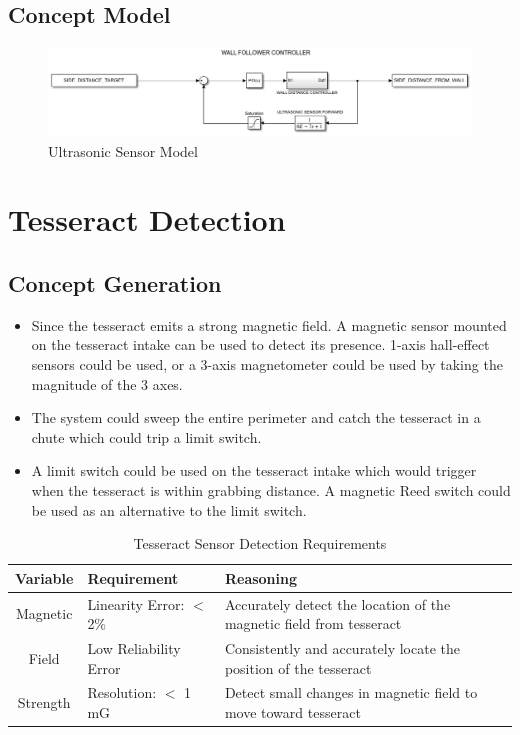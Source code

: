 \documentclass[12pt]{article}
\begin{document}
\subsection{Concept Model}
\begin{figure}[htb!]
\begin{center}
\caption{Ultrasonic Sensor Model}
\includegraphics[scale=0.6]{Figures/simulink_ultrasonic}
\end{center}
\end{figure}
\FloatBarrier

\vspace*{-\baselineskip}
\section{Tesseract Detection}
\subsection{Concept Generation}
\begin{itemize}
\item Since the tesseract emits a strong magnetic field. A magnetic sensor mounted on the tesseract intake can be used to detect its presence. 1-axis hall-effect sensors could be used, or a 3-axis magnetometer could be used by taking the magnitude of the 3 axes.

\item The system could sweep the entire perimeter and catch the tesseract in a chute which could trip a limit switch.

\item A limit switch could be used on the tesseract intake which would trigger when the tesseract is within grabbing distance. A magnetic Reed switch could be used as an alternative to the limit switch.
\end{itemize}

\begin{table}[htbp]
  \centering
  \caption{Tesseract Sensor Detection Requirements}
    \begin{tabular}{c|p{11.5em}|p{29.89em}}
    \multicolumn{1}{p{5.5em}|}{\textbf{Variable}} & \textbf{Requirement} & \textbf{Reasoning} \bigstrut[b]\\
    \hline
    Magnetic & Linearity Error: $<$ 2\% & Accurately detect the location of the magnetic field from tesseract \bigstrut[t]\\
    Field  & Low Reliability Error & Consistently and accurately locate the position of the tesseract \\
    Strength & Resolution: $<$ 1 mG & Detect small changes in magnetic field to move toward tesseract \\
    \end{tabular}%
  \label{tab:addlabel}%
\end{table}%
\end{document}
